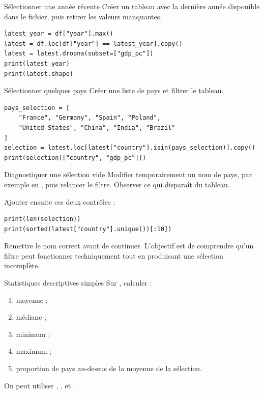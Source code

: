\documentclass[11pt,a4paper]{article}
\begin{document}
\begin{mandatoryexercise}{Sélectionner une année récente}
Créer un tableau  avec la dernière année disponible dans le fichier, puis retirer les valeurs manquantes.
\begin{lstlisting}
latest_year = df["year"].max()
latest = df.loc[df["year"] == latest_year].copy()
latest = latest.dropna(subset=["gdp_pc"])
print(latest_year)
print(latest.shape)
\end{lstlisting}
\end{mandatoryexercise}

\begin{mandatoryexercise}{Sélectionner quelques pays}
Créer une liste de pays et filtrer le tableau.
\begin{lstlisting}
pays_selection = [
    "France", "Germany", "Spain", "Poland",
    "United States", "China", "India", "Brazil"
]
selection = latest.loc[latest["country"].isin(pays_selection)].copy()
print(selection[["country", "gdp_pc"]])
\end{lstlisting}
\end{mandatoryexercise}

\begin{mandatoryexercise}{Diagnostiquer une sélection vide}
Modifier temporairement un nom de pays, par exemple  en , puis relancer le filtre. Observer ce qui disparaît du tableau.

Ajouter ensuite ces deux contrôles :
\begin{lstlisting}
print(len(selection))
print(sorted(latest["country"].unique())[:10])
\end{lstlisting}
Remettre le nom correct avant de continuer. L'objectif est de comprendre qu'un filtre peut fonctionner techniquement tout en produisant une sélection incomplète.
\end{mandatoryexercise}

\begin{mandatoryexercise}{Statistiques descriptives simples}
Sur , calculer :
\begin{enumerate}
  \item moyenne ;
  \item médiane ;
  \item minimum ;
  \item maximum ;
  \item proportion de pays au-dessus de la moyenne de la sélection.
\end{enumerate}
On peut utiliser , ,  et .
\end{mandatoryexercise}
\end{document}
